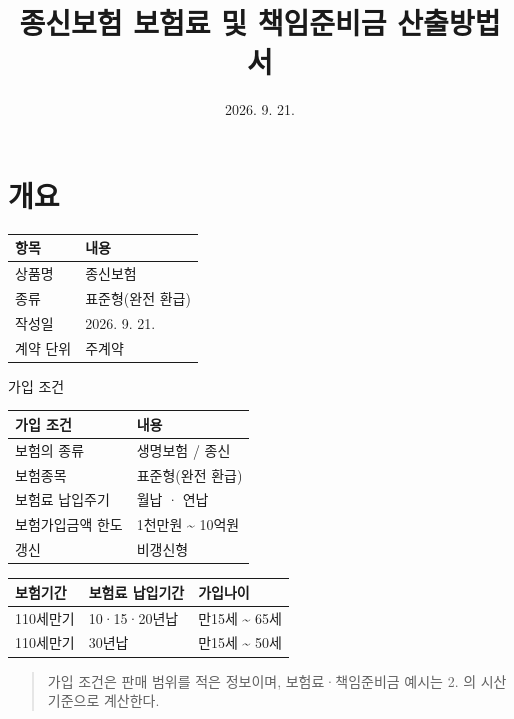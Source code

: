 \documentclass[10pt,a4paper]{article}
\title{종신보험 보험료 및 책임준비금 산출방법서}
\date{2026. 9. 21.}
\begin{document}
\maketitle

\section*{개요}

\begin{center}\small
\begin{tabular}{|l|l|}
\hline
\textbf{항목} & \textbf{내용} \\
\hline
상품명 & 종신보험 \\
종류 & 표준형(완전 환급) \\
작성일 & 2026. 9. 21. \\
계약 단위 & 주계약 \\
\hline
\end{tabular}
\end{center}

가입 조건

\begin{center}\small
\begin{tabular}{|l|l|}
\hline
\textbf{가입 조건} & \textbf{내용} \\
\hline
보험의 종류 & 생명보험 / 종신 \\
보험종목 & 표준형(완전 환급) \\
보험료 납입주기 & 월납 · 연납 \\
보험가입금액 한도 & 1천만원 \textasciitilde{} 10억원 \\
갱신 & 비갱신형 \\
\hline
\end{tabular}
\end{center}

\begin{center}\small
\begin{tabular}{|l|l|l|}
\hline
\textbf{보험기간} & \textbf{보험료 납입기간} & \textbf{가입나이} \\
\hline
110세만기 & 10·15·20년납 & 만15세 \textasciitilde{} 65세 \\
110세만기 & 30년납 & 만15세 \textasciitilde{} 50세 \\
\hline
\end{tabular}
\end{center}

\begin{quote}\small
가입 조건은 판매 범위를 적은 정보이며, 보험료·책임준비금 예시는 2. 의 시산 기준으로 계산한다.
\end{quote}
\end{document}
